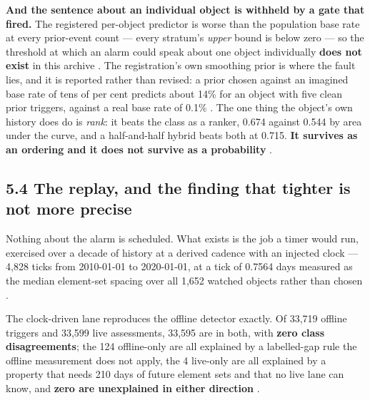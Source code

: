 \documentclass[11pt]{article}
\begin{document}
\textbf{And the sentence about an individual object is withheld by a gate that fired.} The registered per-object predictor is worse than the population base rate at every prior-event count --- every stratum's \emph{upper} bound is below zero --- so the threshold at which an alarm could speak about one object individually \textbf{does not exist} in this archive%
. The registration's own smoothing prior is where the fault lies, and it is reported rather than revised: a prior chosen against an imagined base rate of tens of per cent predicts about 14\% for an object with five clean prior triggers, against a real base rate of 0.1\%%
. The one thing the object's own history does do is \emph{rank}: it beats the class as a ranker, 0.674 against 0.544 by area under the curve, and a half-and-half hybrid beats both at 0.715. \textbf{It survives as an ordering and it does not survive as a probability}%
.

\subsection*{5.4 The replay, and the finding that tighter is not more precise}

Nothing about the alarm is scheduled. What exists is the job a timer would run, exercised over a decade of history at a derived cadence with an injected clock --- 4,828 ticks from 2010-01-01 to 2020-01-01, at a tick of 0.7564 days measured as the median element-set spacing over all 1,652 watched objects rather than chosen%
.

The clock-driven lane reproduces the offline detector exactly. Of 33,719 offline triggers and 33,599 live assessments, 33,595 are in both, with \textbf{zero class disagreements}; the 124 offline-only are all explained by a labelled-gap rule the offline measurement does not apply, the 4 live-only are all explained by a property that needs 210 days of future element sets and that no live lane can know, and \textbf{zero are unexplained in either direction}%
.
\end{document}
